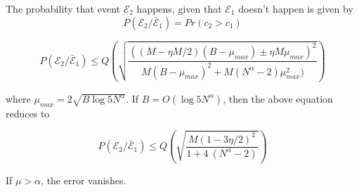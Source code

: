 The probability that event $\mathcal{E}_2$ happens, given that $\mathcal{E}_1$ doesn't happen is given by
\[ P(\mathcal{E}_2 / \bar{\mathcal{E}}_1 ) = Pr(c_2 > c_1) \]



\[ P(\mathcal{E}_2 / \bar{\mathcal{E}}_1 ) \leq Q \left( \sqrt{\frac{((M-\eta M/2)(B-\mu_{max}) \pm \eta M \mu_{max})^2}{M(B-\mu_{max})^2 + M(N^{\alpha}-2)\mu_{max}^2)}} \right) \]

where $\mu_{max} = 2\sqrt{B \log 5 N^{\alpha}} $. If $B = O(\log 5 N^{\alpha})$, then the above equation reduces to

\[ P(\mathcal{E}_2 / \bar{\mathcal{E}}_1 ) \leq Q \left( \sqrt{\frac{M(1-3\eta/2)^2}{1 + 4~ (N^{\alpha}-2)}} \right) \]

If $\mu > \alpha$, the error vanishes.